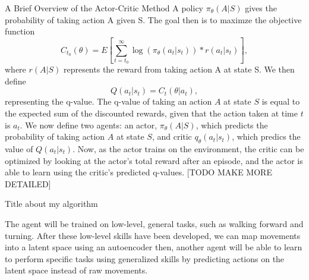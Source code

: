 \documentclass[a4paper]{article}
\begin{document}
\large 
A Brief Overview of the Actor-Critic Method\linebreak
\normalsize
A policy $\pi_\theta(A|S)$ gives the probability of taking action A given S.\linebreak
The goal then is to maximze the objective function 
$$C_{t_0}(\theta) = E[\sum_{t=t_0}^{\infty} \log(\pi_\theta(a_t|s_t)) * r(a_t|s_t)],$$
where $r(A|S)$ represents the reward from taking action A at state S. We then define 
$$Q(a_t|s_t) = C_{t}(\theta|a_t),$$
representing the q-value. The q-value of taking an action $A$ at state $S$ is equal to the expected sum of the discounted rewards, 
given that the action taken at time $t$ is $a_t$.
We now define two agents: an actor, $\pi_\theta(A|S)$, which predicts the probability of taking action $A$ at state $S$, and critic $q_\theta(a_t|s_t)$,
which predics the value of $Q(a_t|s_t)$. Now, as the actor trains on the environment, the critic can be optimized by looking at the actor's total reward after an episode,
and the actor is able to learn using the critic's predicted q-values. [TODO MAKE MORE DETAILED]\linebreak

\large
Title about my algorithm
\normalsize

The agent will be trained on low-level, general tasks, such as walking forward and turning.
After these low-level skills have been developed, we can map movements into a latent space using an autoencoder
then, another agent will be able to learn to perform specific tasks using generalized skills by 
predicting actions on the latent space instead of raw movements.
\end{document}
